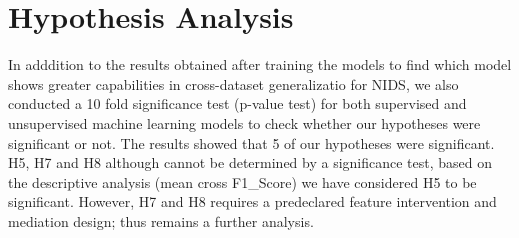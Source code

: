 \section{Hypothesis Analysis}
In adddition to the results obtained after training the models to find which model shows greater capabilities in cross-dataset generalizatio 
for NIDS, we also conducted a 10 fold significance test (p-value test) for both supervised and unsupervised machine learning models to check whether 
our hypotheses were significant or not. The results showed that 5 of our hypotheses were significant. H5, H7 and H8 although cannot be determined by 
a significance test, based on the descriptive analysis (mean cross F1\_Score) we have considered H5 to be significant. However, H7 and H8 requires a 
predeclared feature intervention and mediation design; thus remains a further analysis.

